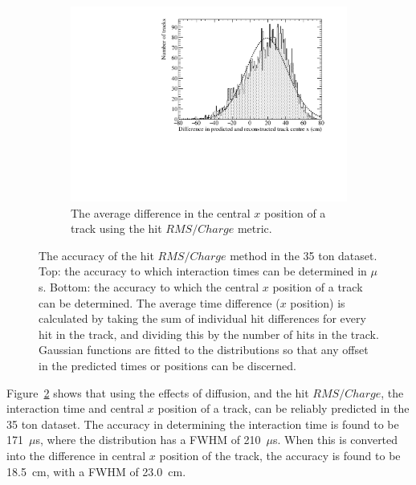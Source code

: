\begin{figure}
  \begin{subfigure}{0.6\textwidth}
    \centering
    \includegraphics[width=\textwidth]{Data_AvXPosDiff_RMS_Int}
    \caption{The average difference in the central $x$ position of a track using the hit $RMS/Charge$ metric.}
    \label{fig:DiffDataAvDiff_RMS_Int_X}
  \end{subfigure}
  \caption[The accuracy of the hit $RMS/Charge$ method in the 35 ton dataset]
          {The accuracy of the hit $RMS/Charge$ method in the 35 ton dataset. Top: the accuracy to which interaction times can be determined in $\mu$s. Bottom: the accuracy to which the central $x$ position of a track can be determined. The average time difference ($x$ position) is calculated by taking the sum of individual hit differences for every hit in the track, and dividing this by the number of hits in the track. Gaussian functions are fitted to the distributions so that any offset in the predicted times or positions can be discerned.}
  \label{fig:DiffDataAvDiff_RMS_Int}
\end{figure}

Figure~\ref{fig:DiffDataAvDiff_RMS_Int} shows that using the effects of diffusion, and the hit $RMS/Charge$, the interaction time and central $x$ position of a track, can be reliably predicted in the 35 ton dataset. The accuracy in determining the interaction time is found to be 171~$\mu$s, where the distribution has a FWHM of 210~$\mu$s. When this is converted into the difference in central $x$ position of the track, the accuracy is found to be 18.5~cm, with a FWHM of 23.0~cm. \\

